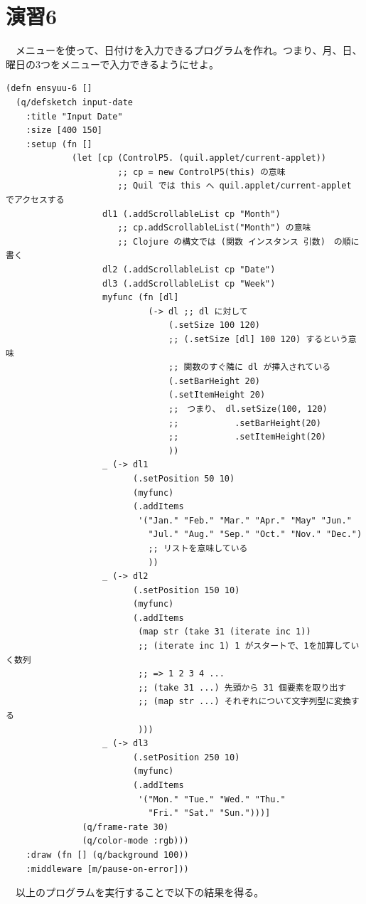 \documentclass{scrartcl}
\begin{document}
\section{演習6}
\label{sec:orgeddd7dd}
　メニューを使って、日付けを入力できるプログラムを作れ。つまり、月、日、曜日の3つをメニューで入力できるようにせよ。\\
\begin{verbatim}
(defn ensyuu-6 []
  (q/defsketch input-date
    :title "Input Date"
    :size [400 150]
    :setup (fn []
             (let [cp (ControlP5. (quil.applet/current-applet))
                      ;; cp = new ControlP5(this) の意味
                      ;; Quil では this へ quil.applet/current-applet でアクセスする
                   dl1 (.addScrollableList cp "Month")
                      ;; cp.addScrollableList("Month") の意味
                      ;; Clojure の構文では (関数 インスタンス 引数)　の順に書く
                   dl2 (.addScrollableList cp "Date")
                   dl3 (.addScrollableList cp "Week")
                   myfunc (fn [dl]
                            (-> dl ;; dl に対して
                                (.setSize 100 120) 
                                ;; (.setSize [dl] 100 120) するという意味
                                ;; 関数のすぐ隣に dl が挿入されている
                                (.setBarHeight 20)
                                (.setItemHeight 20)
                                ;;　つまり、 dl.setSize(100, 120)
                                ;;           .setBarHeight(20)
                                ;;           .setItemHeight(20)
                                ))
                   _ (-> dl1
                         (.setPosition 50 10)
                         (myfunc)
                         (.addItems
                          '("Jan." "Feb." "Mar." "Apr." "May" "Jun." 
                            "Jul." "Aug." "Sep." "Oct." "Nov." "Dec.")
                            ;; リストを意味している
                            ))
                   _ (-> dl2
                         (.setPosition 150 10)
                         (myfunc)
                         (.addItems
                          (map str (take 31 (iterate inc 1))
                          ;; (iterate inc 1) 1 がスタートで、1を加算していく数列
                          ;; => 1 2 3 4 ...
                          ;; (take 31 ...) 先頭から 31 個要素を取り出す
                          ;; (map str ...) それぞれについて文字列型に変換する
                          )))
                   _ (-> dl3
                         (.setPosition 250 10)
                         (myfunc)
                         (.addItems
                          '("Mon." "Tue." "Wed." "Thu."
                            "Fri." "Sat." "Sun.")))]
               (q/frame-rate 30)
               (q/color-mode :rgb)))
    :draw (fn [] (q/background 100))
    :middleware [m/pause-on-error]))
\end{verbatim}
　以上のプログラムを実行することで以下の結果を得る。\\
\end{document}
